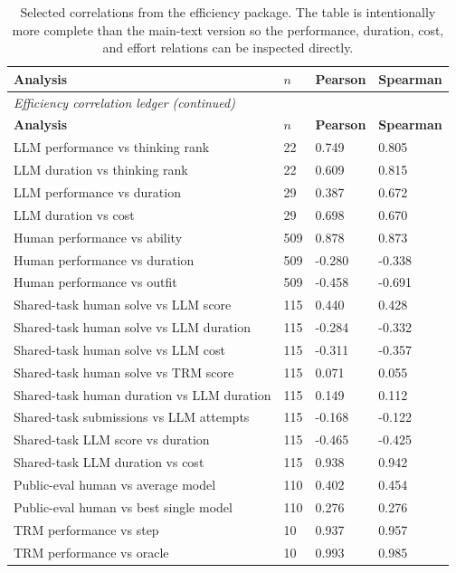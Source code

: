 {\scriptsize
\begin{longtable}{p{2.8in}p{0.45in}p{0.7in}p{0.7in}}
\caption{Selected correlations from the efficiency package. The table is intentionally more complete than the main-text version so the performance, duration, cost, and effort relations can be inspected directly.} \\
\toprule
\textbf{Analysis} & \textbf{$n$} & \textbf{Pearson} & \textbf{Spearman} \\
\midrule
\endfirsthead
\multicolumn{4}{l}{\small\itshape Efficiency correlation ledger (continued)} \\
\toprule
\textbf{Analysis} & \textbf{$n$} & \textbf{Pearson} & \textbf{Spearman} \\
\midrule
\endhead
LLM performance vs thinking rank & 22 & 0.749 & 0.805 \\
LLM duration vs thinking rank & 22 & 0.609 & 0.815 \\
LLM performance vs duration & 29 & 0.387 & 0.672 \\
LLM duration vs cost & 29 & 0.698 & 0.670 \\
Human performance vs ability & 509 & 0.878 & 0.873 \\
Human performance vs duration & 509 & -0.280 & -0.338 \\
Human performance vs outfit & 509 & -0.458 & -0.691 \\
Shared-task human solve vs LLM score & 115 & 0.440 & 0.428 \\
Shared-task human solve vs LLM duration & 115 & -0.284 & -0.332 \\
Shared-task human solve vs LLM cost & 115 & -0.311 & -0.357 \\
Shared-task human solve vs TRM score & 115 & 0.071 & 0.055 \\
Shared-task human duration vs LLM duration & 115 & 0.149 & 0.112 \\
Shared-task submissions vs LLM attempts & 115 & -0.168 & -0.122 \\
Shared-task LLM score vs duration & 115 & -0.465 & -0.425 \\
Shared-task LLM duration vs cost & 115 & 0.938 & 0.942 \\
Public-eval human vs average model & 110 & 0.402 & 0.454 \\
Public-eval human vs best single model & 110 & 0.276 & 0.276 \\
TRM performance vs step & 10 & 0.937 & 0.957 \\
TRM performance vs oracle & 10 & 0.993 & 0.985 \\
\bottomrule
\end{longtable}
}
